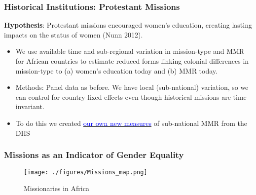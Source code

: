 \documentclass[9pt,letterpaper,subeqn]{beamer}
\begin{document}
\begin{frame}[label=MMRSub]
\frametitle{Historical Institutions: Protestant Missions}
\textbf{Hypothesis}: Protestant missions encouraged women's education, creating lasting impacts on the status of women (Nunn 2012).
\vspace{5mm}
\begin{itemize}
\setlength{\itemsep}{10pt}
  \item We use available time and sub-regional variation in mission-type and MMR for African countries to estimate reduced forms linking colonial differences in mission-type to (a) women's education today and (b) MMR today. 
  \item Methods: Panel data as before. We have local (sub-national) variation, so we can control for country fixed effects even though historical missions are time-invariant.
  \item To do this we created \hyperlink{MMRcompar}{\textcolor{blue}{our own new measures}} of sub-national MMR from the DHS  
	
\end{itemize}
\end{frame}


\begin{frame}[label=MissionsMap]
\frametitle{Missions as an Indicator of Gender Equality}
%
\begin{figure}[h!]
\centering
\texttt{[image: ./figures/Missions\_map.png]}
\caption{Missionaries in Africa }
\end{figure}
\end{frame}


\end{document}

